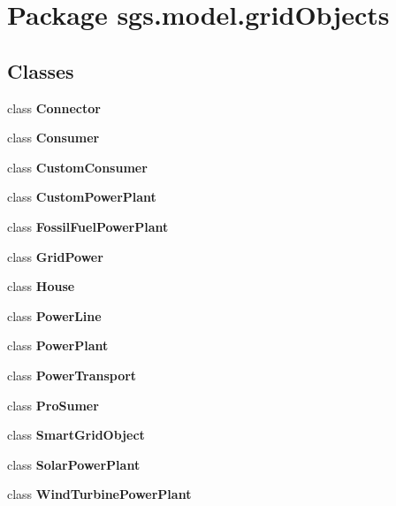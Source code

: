 \section{Package sgs.\-model.\-grid\-Objects}
\label{namespacesgs_1_1model_1_1grid_objects}
\subsection*{Classes}
\begin{DoxyCompactItemize}
\item 
class {\bf Connector}
\item 
class {\bf Consumer}
\item 
class {\bf Custom\-Consumer}
\item 
class {\bf Custom\-Power\-Plant}
\item 
class {\bf Fossil\-Fuel\-Power\-Plant}
\item 
class {\bf Grid\-Power}
\item 
class {\bf House}
\item 
class {\bf Power\-Line}
\item 
class {\bf Power\-Plant}
\item 
class {\bf Power\-Transport}
\item 
class {\bf Pro\-Sumer}
\item 
class {\bf Smart\-Grid\-Object}
\item 
class {\bf Solar\-Power\-Plant}
\item 
class {\bf Wind\-Turbine\-Power\-Plant}
\end{DoxyCompactItemize}
